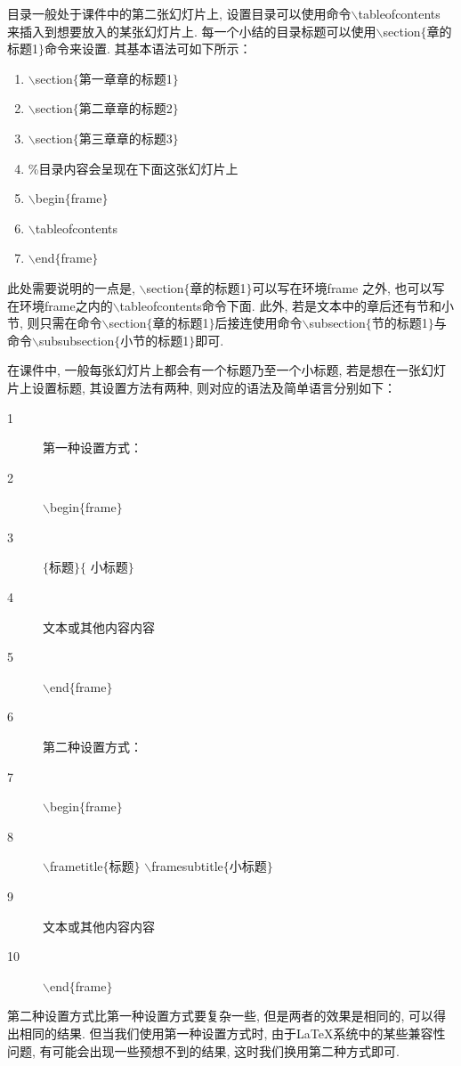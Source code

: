 目录一般处于课件中的第二张幻灯片上, 设置目录可以使用命令$\backslash$tableofcontents 来插入到想要放入的某张幻灯片上. 每一个小结的目录标题可以使用$\backslash$section$\{$章的标题1$\}$命令来设置. 其基本语法可如下所示：
\begin{multicols}{2}
\begin{enumerate}
  \item[1]$\backslash$section$\{$第一章\hspace{10pt}章的标题1$\}$
  \item[2]$\backslash$section$\{$第二章\hspace{10pt}章的标题2$\}$
  \item[3]$\backslash$section$\{$第三章\hspace{10pt}章的标题3$\}$
  \item[4] \%目录内容会呈现在下面这张幻灯片上
  \item[5]$\backslash$begin$\{$frame$\}$
  \item[6]$\backslash$tableofcontents
  \item[7]$\backslash$end$\{$frame$\}$
\end{enumerate}
\end{multicols}
此处需要说明的一点是, $\backslash$section$\{$章的标题1$\}$可以写在环境frame 之外, 也可以写在环境frame之内的$\backslash$tableofcontents命令下面. 此外, 若是文本中的章后还有节和小节, 则只需在命令$\backslash$section$\{$章的标题1$\}$后接连使用命令$\backslash$subsection$\{$节的标题1$\}$与命令$\backslash$subsubsection$\{$小节的标题1$\}$即可.

在课件中, 一般每张幻灯片上都会有一个标题乃至一个小标题, 若是想在一张幻灯片上设置标题, 其设置方法有两种, 则对应的语法及简单语言分别如下：\medskip

\begin{multicols}{2}
\begin{description}
    \item[1] 第一种设置方式：
   \item[2] $\backslash$begin$\{$frame$\}$
   \item[3] $\{$标题$\}\{$ 小标题$\}$
   \item[4] 文本或其他内容内容
   \item[5]$\backslash$end$\{$frame$\}$
   \item[6] 第二种设置方式：
   \item[7]$\backslash$begin$\{$frame$\}$
   \item[8]$\backslash$frametitle\!$\{$\!标题\!$\}$
$\backslash$framesubtitle$\{$小标题$\}$
   \item[9] 文本或其他内容内容
   \item[10]$\backslash$end$\{$frame$\}$
\end{description}
 \end{multicols}
第二种设置方式比第一种设置方式要复杂一些, 但是两者的效果是相同的, 可以得出相同的结果. 但当我们使用第一种设置方式时, 由于\LaTeX{}系统中的某些兼容性问题, 有可能会出现一些预想不到的结果, 这时我们换用第二种方式即可.
